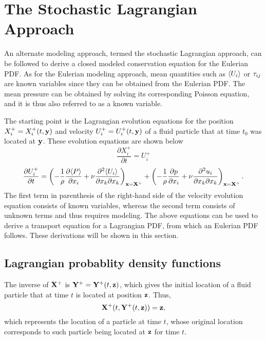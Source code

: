 \documentclass[oneside,a4paper,11pt]{report}
\begin{document}
\section{The Stochastic Lagrangian Approach}

An alternate modeling approach, termed the stochastic Lagrangian approach, can be followed to derive a closed modeled conservation equation for the Eulerian PDF. As for the Eulerian modeling approach, mean quantities such as $\langle U_i \rangle$ or $\tau_{ij}$ are known variables since they can be obtained from the Eulerian PDF. The mean pressure can be obtained by solving its corresponding Poisson equation, and it is thus also referred to as a known variable. 

The starting point is the Lagrangian evolution equations for the position $X_i^+ = X_i^+(t,\mathbf{y})$ and velocity $U_i^+ = U_i^+(t,\mathbf{y})$ of a fluid particle that at time $t_0$ was located at $\mathbf{y}$. These evolution equations are shown below 
\begin{equation}
\frac{\partial X_i^+}{\partial t} = U_i^+ 
\end{equation}
\begin{equation}
\frac{\partial U_i^+}{\partial t} = \left (-\frac{1}{\rho} \frac{\partial \langle P \rangle}{\partial x_i} + \nu \frac{\partial^2 \langle U_i \rangle}{\partial x_k \partial x_k} \right)_{\mathbf{x} = \mathbf{X}^+} + \left ( - \frac{1}{\rho} \frac{\partial p}{\partial x_i} +  \nu \frac{\partial^2 u_i}{\partial x_k \partial x_k} \right)_{\mathbf{x} = \mathbf{X}^+}.
\end{equation}
The first term in parenthesis of the right-hand side of the velocity evolution equation consists of known variables, whereas the second term consists of unknown terms and thus requires modeling. The above equations can be used to derive a transport equation for a Lagrangian PDF, from which an Eulerian PDF follows. These derivations will be shown in this section. 

\subsection{Lagrangian probablity density functions}

The inverse of $\mathbf{X}^+$ is $\mathbf{Y}^+ = \mathbf{Y}^+(t,\mathbf{z})$, which gives the initial location of a fluid particle that at time $t$ is located at position $\mathbf{z}$. Thus,
\begin{equation}
\mathbf{X}^+(t,\mathbf{Y}^+(t,\mathbf{z})) = \mathbf{z},
\end{equation}
which represents the location of a particle at time $t$, whose original location corresponds to such particle being located at $\mathbf{z}$ for time $t$.
\end{document}
